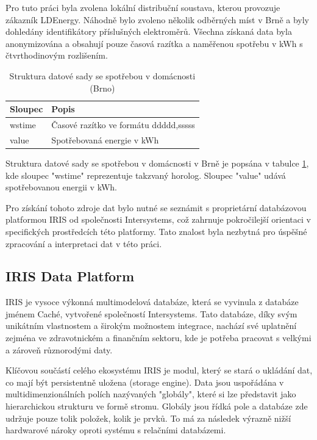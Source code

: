 \documentclass[FM,BP,fonts]{tulthesis}
\begin{document}
Pro tuto práci byla zvolena lokální distribuční soustava, kterou provozuje zákazník LDEnergy. Náhodně bylo zvoleno několik odběrných míst v Brně a byly dohledány identifikátory příslušných elektroměrů. Všechna získaná data byla anonymizována a obsahují pouze časová razítka a naměřenou spotřebu v kWh s čtvrthodinovým rozlišením.


\begin{table}[!ht]
	\centering
	\caption{Struktura datové sady se spotřebou v domácnosti (Brno)}
	\label{structure-brno}
	\begin{tabularx}{\linewidth}{ll}
		\hline
		\textbf{Sloupec} & \textbf{Popis} \\ \hline
		wstime & Časové razítko ve formátu ddddd,sssss \\ 
		value & Spotřebovaná energie v kWh \\ 
		\hline
	\end{tabularx}
\end{table}

Struktura datové sady se spotřebou v domácnosti v Brně je popsána v tabulce \ref{structure-brno}, kde sloupec "wstime" reprezentuje takzvaný horolog. Sloupec "value" udává spotřebovanou energii v kWh.

Pro získání tohoto zdroje dat bylo nutné se seznámit s proprietární databázovou platformou IRIS od společnosti Intersystems, což zahrnuje pokročilejší orientaci v specifických prostředcích této platformy. Tato znalost byla nezbytná pro úspěšné zpracování a interpretaci dat v této práci.


\newpage
\subsection{IRIS Data Platform}
IRIS je vysoce výkonná multimodelová databáze, která se vyvinula z databáze jménem Caché, vytvořené společností Intersystems. Tato databáze, díky svým unikátním vlastnostem a širokým možnostem integrace, nachází své uplatnění zejména ve zdravotnickém a finančním sektoru, kde je potřeba pracovat s velkými a zároveň různorodými daty.

Klíčovou součástí celého ekosystému IRIS je modul, který se stará o ukládání dat, co mají být persistentně uložena (storage engine). Data jsou uspořádána v multidimenzionálních polích nazývaných "globály", které si lze představit jako hierarchickou strukturu ve formě stromu. Globály jsou řídká pole a databáze zde udržuje pouze tolik položek, kolik je prvků. To má za následek výrazně nižší hardwarové nároky oproti systému s relačními databázemi. 
\end{document}
